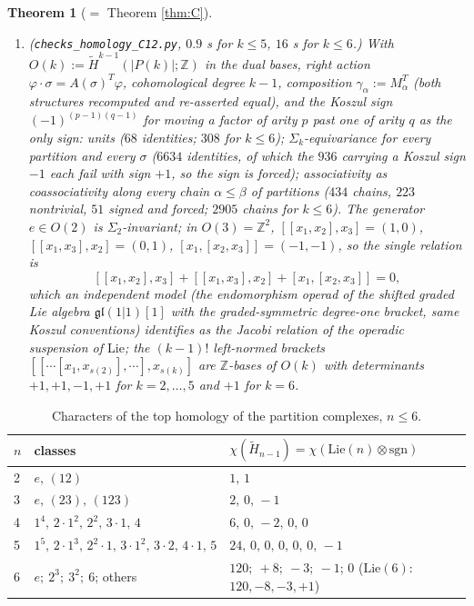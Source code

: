 \documentclass[11pt]{amsart}
\newtheorem{theorem}[subsection]{Theorem}
\theoremstyle{definition}
\theoremstyle{remark}
\newcommand{\Z}{\mathbb{Z}}
\newcommand{\sgn}{\mathrm{sgn}}
\newcommand{\Hred}{\widetilde{H}}
\begin{document}
\begin{theorem}[$=$ Theorem \ref{thm:C}]
\begin{enumerate}[label=(\roman*),leftmargin=2em]
\item (\texttt{checks\_homology\_C12.py}, $0.9$ s for $k\leq5$, $16$ s for $k\leq6$.) With $O(k):=\Hred^{k-1}(|P(k)|;\Z)$ in the dual bases, right action $\varphi\cdot\sigma=A(\sigma)^T\varphi$, cohomological degree $k-1$, composition $\gamma_\alpha:=M_\alpha^T$ (both structures recomputed and re-asserted equal), and the Koszul sign $(-1)^{(p-1)(q-1)}$ for moving a factor of arity $p$ past one of arity $q$ as the only sign: units ($68$ identities; $308$ for $k\leq6$); $\Sigma_k$-equivariance for every partition and every $\sigma$ ($6634$ identities, of which the $936$ carrying a Koszul sign $-1$ each fail with sign $+1$, so the sign is forced); associativity as coassociativity along every chain $\alpha\leq\beta$ of partitions ($434$ chains, $223$ nontrivial, $51$ signed and forced; $2905$ chains for $k\leq6$). The generator $e\in O(2)$ is $\Sigma_2$-invariant; in $O(3)=\Z^2$, $[[x_1,x_2],x_3]=(1,0)$, $[[x_1,x_3],x_2]=(0,1)$, $[x_1,[x_2,x_3]]=(-1,-1)$, so the single relation is
\[ [[x_1,x_2],x_3]+[[x_1,x_3],x_2]+[x_1,[x_2,x_3]]=0, \]
which an independent model (the endomorphism operad of the shifted graded Lie algebra $\mathfrak{gl}(1|1)[1]$ with the graded-symmetric degree-one bracket, same Koszul conventions) identifies as the Jacobi relation of the operadic suspension of $\mathrm{Lie}$; the $(k-1)!$ left-normed brackets $[[\cdots[x_1,x_{s(2)}],\cdots],x_{s(k)}]$ are $\Z$-bases of $O(k)$ with determinants $+1,+1,-1,+1$ for $k=2,\dots,5$ and $+1$ for $k=6$.
\end{enumerate}
\end{theorem}

\begin{table}[h]
\centering\small
\begin{tabular}{@{}lll@{}}
\toprule
$n$ & classes & $\chi(\Hred_{n-1})=\chi(\mathrm{Lie}(n)\otimes\sgn)$\\
\midrule
2 & $e,\,(12)$ & $1,\,1$\\
3 & $e,\,(23),\,(123)$ & $2,\,0,\,-1$\\
4 & $1^4,\,2\cdot1^2,\,2^2,\,3\cdot1,\,4$ & $6,\,0,\,-2,\,0,\,0$\\
5 & $1^5,\,2\cdot1^3,\,2^2\cdot1,\,3\cdot1^2,\,3\cdot2,\,4\cdot1,\,5$ & $24,\,0,\,0,\,0,\,0,\,0,\,-1$\\
6 & $e;\ 2^3;\ 3^2;\ 6$; others & $120;\ +8;\ -3;\ -1$; $0$ \quad ($\mathrm{Lie}(6)$: $120,-8,-3,+1$)\\
\bottomrule
\end{tabular}
\caption{Characters of the top homology of the partition complexes, $n\leq6$.}\label{tab:char}
\end{table}
\end{document}
